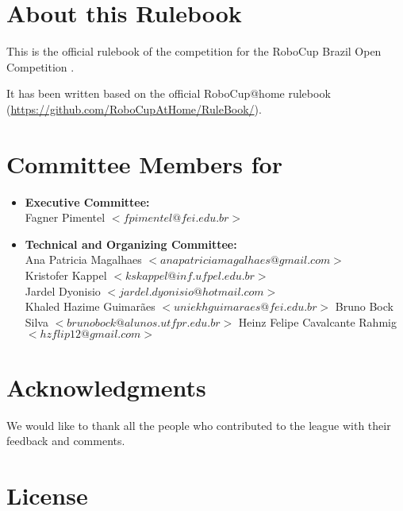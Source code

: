 

\section*{About this Rulebook}  
This is the official rulebook of the \AtHome{} competition for the RoboCup Brazil Open Competition \YEAR.

It has been written based on the official RoboCup@home rulebook (\url{https://github.com/RoboCupAtHome/RuleBook/}). 

\section*{Committee Members for \YEAR}
\begin{itemize}
    \item \textbf{Executive Committee:} \\ Fagner Pimentel $<fpimentel@fei.edu.br>$
    \item \textbf{Technical and Organizing Committee:} \\ 
    Ana Patricia Magalhaes $<anapatriciamagalhaes@gmail.com>$ \\
    Kristofer Kappel $<kskappel@inf.ufpel.edu.br>$ \\
    Jardel Dyonisio  $<jardel.dyonisio@hotmail.com>$ \\
    Khaled Hazime Guimarães $<uniekhguimaraes@fei.edu.br>$
    Bruno Bock Silva $<brunobock@alunos.utfpr.edu.br>$
    Heinz Felipe Cavalcante Rahmig $<hzflip12@gmail.com>$
\end{itemize}

\section*{Acknowledgments}
\label{sec:acknowledgments}

We would like to thank all the people who contributed to the \AtHome{} league with their feedback and comments.

\vfill

\section*{License}

\doclicenseThis

